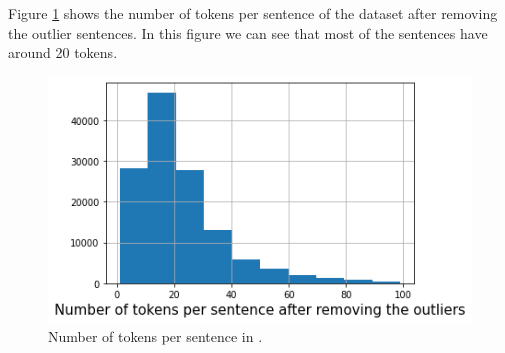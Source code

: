 Figure \ref{amazon_en_tokens_per_sentence} shows the number of tokens per sentence of the dataset after removing the outlier sentences. In this figure we can see that most of the sentences have around 20 tokens.
\begin{figure}[h]
\centerline{\includegraphics[scale=.5]{images/tokens_per_sentence_amazon_eng_after.png}}
\caption{Number of tokens per sentence in \dataEN.}
\label{amazon_en_tokens_per_sentence}
\end{figure}
